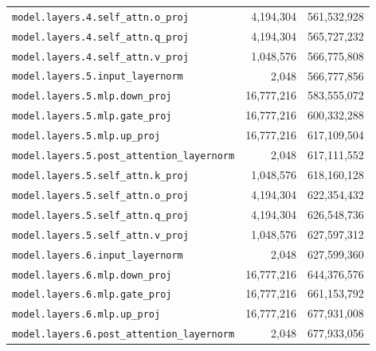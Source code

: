\documentclass[10pt,a4paper]{article}
\begin{document}
\begin{appendices}
\begin{longtable}{p{9.5cm}rr}
\texttt{model.\allowbreak{}layers.\allowbreak{}4.\allowbreak{}self\_attn.\allowbreak{}o\_proj} & 4,194,304 & 561,532,928 \\
\texttt{model.\allowbreak{}layers.\allowbreak{}4.\allowbreak{}self\_attn.\allowbreak{}q\_proj} & 4,194,304 & 565,727,232 \\
\texttt{model.\allowbreak{}layers.\allowbreak{}4.\allowbreak{}self\_attn.\allowbreak{}v\_proj} & 1,048,576 & 566,775,808 \\
\texttt{model.\allowbreak{}layers.\allowbreak{}5.\allowbreak{}input\_layernorm} & 2,048 & 566,777,856 \\
\texttt{model.\allowbreak{}layers.\allowbreak{}5.\allowbreak{}mlp.\allowbreak{}down\_proj} & 16,777,216 & 583,555,072 \\
\texttt{model.\allowbreak{}layers.\allowbreak{}5.\allowbreak{}mlp.\allowbreak{}gate\_proj} & 16,777,216 & 600,332,288 \\
\texttt{model.\allowbreak{}layers.\allowbreak{}5.\allowbreak{}mlp.\allowbreak{}up\_proj} & 16,777,216 & 617,109,504 \\
\texttt{model.\allowbreak{}layers.\allowbreak{}5.\allowbreak{}post\_attention\_layernorm} & 2,048 & 617,111,552 \\
\texttt{model.\allowbreak{}layers.\allowbreak{}5.\allowbreak{}self\_attn.\allowbreak{}k\_proj} & 1,048,576 & 618,160,128 \\
\texttt{model.\allowbreak{}layers.\allowbreak{}5.\allowbreak{}self\_attn.\allowbreak{}o\_proj} & 4,194,304 & 622,354,432 \\
\texttt{model.\allowbreak{}layers.\allowbreak{}5.\allowbreak{}self\_attn.\allowbreak{}q\_proj} & 4,194,304 & 626,548,736 \\
\texttt{model.\allowbreak{}layers.\allowbreak{}5.\allowbreak{}self\_attn.\allowbreak{}v\_proj} & 1,048,576 & 627,597,312 \\
\texttt{model.\allowbreak{}layers.\allowbreak{}6.\allowbreak{}input\_layernorm} & 2,048 & 627,599,360 \\
\texttt{model.\allowbreak{}layers.\allowbreak{}6.\allowbreak{}mlp.\allowbreak{}down\_proj} & 16,777,216 & 644,376,576 \\
\texttt{model.\allowbreak{}layers.\allowbreak{}6.\allowbreak{}mlp.\allowbreak{}gate\_proj} & 16,777,216 & 661,153,792 \\
\texttt{model.\allowbreak{}layers.\allowbreak{}6.\allowbreak{}mlp.\allowbreak{}up\_proj} & 16,777,216 & 677,931,008 \\
\texttt{model.\allowbreak{}layers.\allowbreak{}6.\allowbreak{}post\_attention\_layernorm} & 2,048 & 677,933,056 \\

\end{longtable}
\end{appendices}
\end{document}
